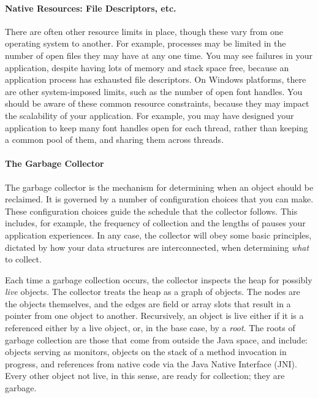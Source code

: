 \paragraph{Native Resources: File Descriptors, etc.}
There are often other resource limits in place, though these vary from one
operating system to another. For example, processes may be limited in the number
of open files they may have at any one time. You may see failures in your
application, despite having lots of memory and stack space free, because an
application process has exhausted file descriptors. On Windows platforms, there
are other system-imposed limits, such as the number of open font handles. You
should be aware of these common resource constraints, because they may impact
the scalability of your application. For example, you may have designed your
application to keep many font handles open for each thread, rather than keeping
a common pool of them, and sharing them across threads.

\paragraph{The Garbage Collector}
The garbage collector is the mechanism for determining when an object should be
reclaimed. It is governed by a number of configuration choices that you can make.
These configuration choices guide the schedule that the collector follows. This
includes, for example, the frequency of collection and the lengths of pauses your
application experiences. In any case, the collector will obey some basic
principles, dictated by how your data structures are interconnected, when
determining \emph{what} to collect.

Each time a garbage collection occurs, the collector inspects the heap for
possibly \emph{live} objects. The collector treats the heap as a graph of
objects. The nodes are the objects themselves, and the edges are field or array
slots that result in a pointer from one object to another.  Recursively, an object is live either if it is a referenced
either by a live object, or, in the base case, by a \emph{root}. The roots of
garbage collection are those that come from outside the Java space, and include:
objects serving as monitors, objects on the stack of a method invocation in
progress, and references from native code via the Java Native Interface (JNI).
Every other object not live, in this sense, are ready for collection; they are
garbage.

